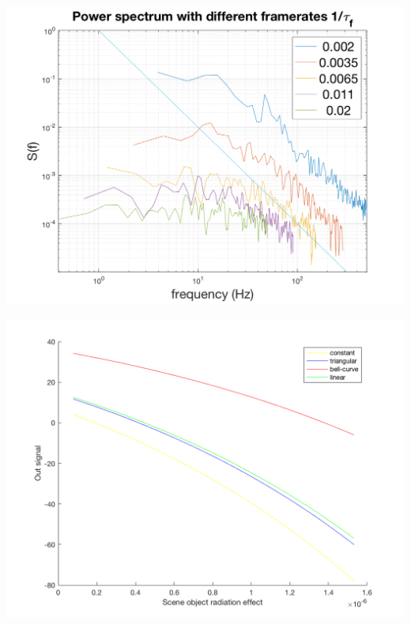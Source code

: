 \begin{center}
\includegraphics[scale=0.35]{gfx/pspec.png} 	 
\end{center}

\begin{center}
\includegraphics[scale=0.2]{gfx/out_vs_inrad} 	 
\end{center}

%
%
